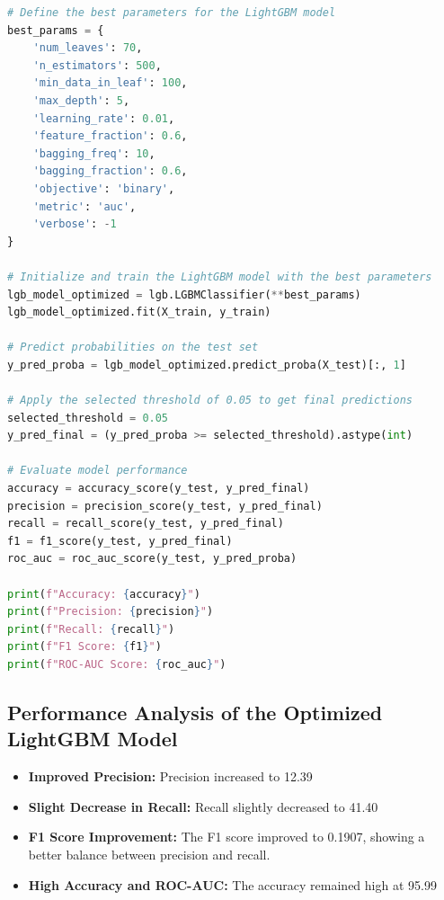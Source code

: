 \documentclass[12pt,a4paper]{report}
\begin{document}
\begin{lstlisting}[language=Python, caption={Training LightGBM with Optimized Parameters}]
# Define the best parameters for the LightGBM model
best_params = {
    'num_leaves': 70,
    'n_estimators': 500,
    'min_data_in_leaf': 100,
    'max_depth': 5,
    'learning_rate': 0.01,
    'feature_fraction': 0.6,
    'bagging_freq': 10,
    'bagging_fraction': 0.6,
    'objective': 'binary',
    'metric': 'auc',
    'verbose': -1
}

# Initialize and train the LightGBM model with the best parameters
lgb_model_optimized = lgb.LGBMClassifier(**best_params)
lgb_model_optimized.fit(X_train, y_train)

# Predict probabilities on the test set
y_pred_proba = lgb_model_optimized.predict_proba(X_test)[:, 1]

# Apply the selected threshold of 0.05 to get final predictions
selected_threshold = 0.05
y_pred_final = (y_pred_proba >= selected_threshold).astype(int)

# Evaluate model performance
accuracy = accuracy_score(y_test, y_pred_final)
precision = precision_score(y_test, y_pred_final)
recall = recall_score(y_test, y_pred_final)
f1 = f1_score(y_test, y_pred_final)
roc_auc = roc_auc_score(y_test, y_pred_proba)

print(f"Accuracy: {accuracy}")
print(f"Precision: {precision}")
print(f"Recall: {recall}")
print(f"F1 Score: {f1}")
print(f"ROC-AUC Score: {roc_auc}")
\end{lstlisting}

\subsection{Performance Analysis of the Optimized LightGBM Model}

\begin{itemize}
    \item \textbf{Improved Precision:} Precision increased to 12.39%
    \item \textbf{Slight Decrease in Recall:} Recall slightly decreased to 41.40%
    \item \textbf{F1 Score Improvement:} The F1 score improved to 0.1907, showing a better balance between precision and recall.
    \item \textbf{High Accuracy and ROC-AUC:} The accuracy remained high at 95.99%
\end{itemize}
\end{document}

